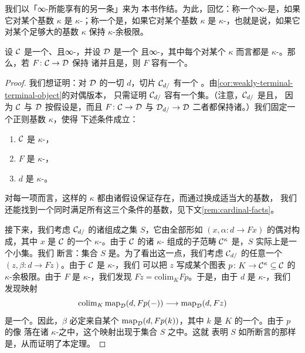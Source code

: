 我们以「\trPresentable{}∞-\trCategories{}所能享有的另一条\trAdjointFunctorTheorem{}」来为
本书作结。为此，回忆：称一个∞-\trCategory{}是\trAccessible{}，如果它对某个基数 $\kappa$
是 $\kappa$-\trAccessible{}；称一个\trFunctor{}是\trAccessible{}，如果它对某个基数 $\kappa$ 是
$\kappa$-\trAccessible{}，也就是说，如果它对某个足够大的基数 $\kappa$ 保持
$\kappa$-\trFiltered{}余极限。

\begin{theorem}\label{thm:adjoint-functor-theorem-limits}
设 $\mathcal{C}$ 是一个\trLocallySmall{}、\trAccessible{}且\trComplete{}∞-\trCategory{}，并设 $\mathcal{D}$ 是一个%
\trLocallySmall{}且\trComplete{}∞-\trCategory{}，其中每个\trObject{}对某个 $\kappa$
而言都是 $\kappa$-\trCompact{}。那么，若\trFunctor{} $F\colon \mathcal{C} \to \mathcal{D}$ 保持
诸\trLimit{}并且是\trAccessible{}，则 $F$ 容有一个\trLeftAdjoint{}。
\end{theorem}

\begin{proof}
我们想证明：对 $\mathcal{D}$ 的一切\trObject{} $d$，切片 $\mathcal{C}_{d/}$ 有一个%
\trInitialObject{}。由\cref{cor:weakly-terminal-terminal-object}的对偶版本，
只需证明 $\mathcal{C}_{d/}$ 容有一个\trWeaklyInitial{}集。（注意，$\mathcal{C}_{d/}$ 是\trLocallySmall{}且\trComplete{}，
因为 $\mathcal{C}$ 与 $\mathcal{D}$ 按假设是\trComplete{}，而且 $F\colon \mathcal{C} \to \mathcal{D}$ 与
$\mathcal{D}_{d/} \to \mathcal{D}$ 二者都保持诸\trLimit{}。）我们固定一个正则基数 $\kappa$，使得
下述条件成立：
\begin{enumerate}[label=(\arabic*)]
  \item $\mathcal{C}$ 是 $\kappa$-\trAccessible{}，
  \item $F$ 是 $\kappa$-\trAccessible{}，
  \item $d$ 是 $\kappa$-\trCompact{}。
\end{enumerate}
对每一项而言，这样的 $\kappa$ 都由诸假设保证存在，而通过换成适当大的基数，
我们还能找到一个同时满足所有这三个条件的基数，见下文\cref{rem:cardinal-facts}。

接下来，我们考虑 $\mathcal{C}_{d/}$ 的诸\trObject{}组成之集 $S$，它由全部形如
$(x, \alpha\colon d \to Fx)$ 的偶对构成，其中 $x$ 是 $\mathcal{C}$ 的一个%
$\kappa$-\trCompact{}\trObject{}。由于 $\mathcal{C}$ 的诸 $\kappa$-\trCompact{}%
\trObject{}组成的子范畴 $\mathcal{C}^{\kappa}$ 是\trEssentiallySmall{}，$S$ 实际上是一个小集。我们
断言：集合 $S$ 是\trWeaklyInitial{}。为了看出这一点，我们考虑 $\mathcal{C}_{d/}$ 的任意一个%
\trObject{} $(z, \beta\colon d \to Fz)$。由于 $\mathcal{C}$ 是 $\kappa$-\trAccessible{}，我们
可以把 $z$ 写成某个图表 $p\colon K \to \mathcal{C}^{\kappa} \subseteq \mathcal{C}$ 的
$\kappa$-\trFiltered{}余极限。由于 $F$ 是 $\kappa$-\trAccessible{}，我们发现
$Fz = \mathrm{colim}_K Fp$。于是，由于 $d$ 是 $\kappa$-\trCompact{}，我们
发现映射
\[
\mathrm{colim}_K\, \mathrm{map}_{\mathcal{D}}(d, Fp(-))
  \longrightarrow \mathrm{map}_{\mathcal{D}}(d, Fz)
\]
是一个\trEquivalence{}。因此，$\beta$ 必定来自某个
$\mathrm{map}_{\mathcal{D}}(d, Fp(k))$，其中 $k$ 是 $K$ 的一个\trObject{}。由于 $p$ 的像
落在诸 $\kappa$-\trCompact{}\trObject{}之中，这个映射出现于集合 $S$ 之中。这就
表明 $S$ 如所断言的那样是\trWeaklyInitial{}，从而证明了本定理。
\end{proof}


